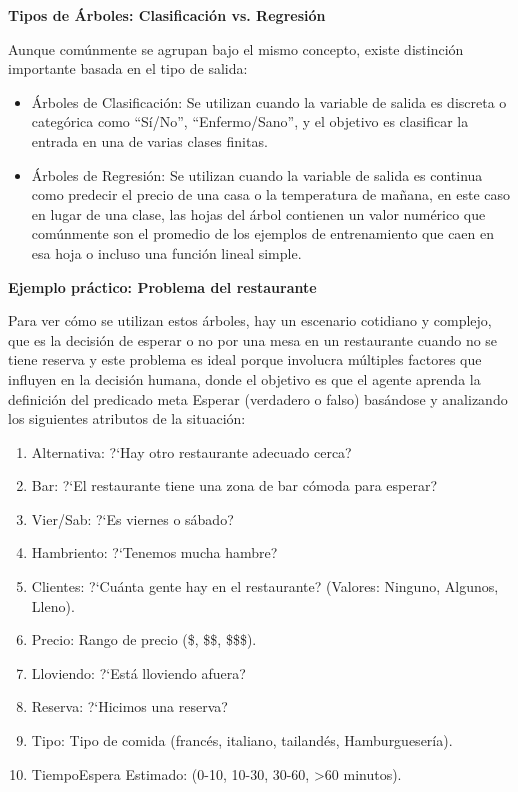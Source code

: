 \documentclass[letterpaper,12pt]{article}
\begin{document}
\begin{itemize}
    \newpage
    \textbf{Tipos de Árboles: Clasificación vs. Regresión}
    
    Aunque comúnmente se agrupan bajo el mismo concepto, existe distinción importante basada en el tipo de salida:
    \begin{itemize}
        \item Árboles de Clasificación: Se utilizan cuando la variable de salida es discreta o categórica como ``Sí/No'', ``Enfermo/Sano'', y el objetivo es clasificar la entrada en una de varias clases finitas.
        \item Árboles de Regresión: Se utilizan cuando la variable de salida es continua como predecir el precio de una casa o la temperatura de mañana, en este caso en lugar de una clase, las hojas del árbol contienen un valor numérico que comúnmente son el promedio de los ejemplos de entrenamiento que caen en esa hoja o incluso una función lineal simple.\\
    \end{itemize}
    
    \textbf{Ejemplo práctico: Problema del restaurante}

    Para ver cómo se utilizan estos árboles, hay un escenario cotidiano y complejo, que es la decisión de esperar o no por una mesa en un restaurante cuando no se tiene reserva y este problema es ideal porque involucra múltiples factores que influyen en la decisión humana, donde el objetivo es que el agente aprenda la definición del predicado meta Esperar (verdadero o falso) basándose y analizando los siguientes atributos de la situación:
    
    \begin{enumerate}
        \item Alternativa: ?`Hay otro restaurante adecuado cerca?
        \item Bar: ?`El restaurante tiene una zona de bar cómoda para esperar?
        \item Vier/Sab: ?`Es viernes o sábado?
        \item Hambriento: ?`Tenemos mucha hambre?
        \item Clientes: ?`Cuánta gente hay en el restaurante? (Valores: Ninguno, Algunos, Lleno).
        \item Precio: Rango de precio (\$, \$\$, \$\$\$).
        \item Lloviendo: ?`Está lloviendo afuera?
        \item Reserva: ?`Hicimos una reserva?
        \item Tipo: Tipo de comida (francés, italiano, tailandés, Hamburguesería).
        \item TiempoEspera Estimado: (0-10, 10-30, 30-60, >60 minutos).\\
    \end{enumerate}


\end{itemize}
\end{document}
